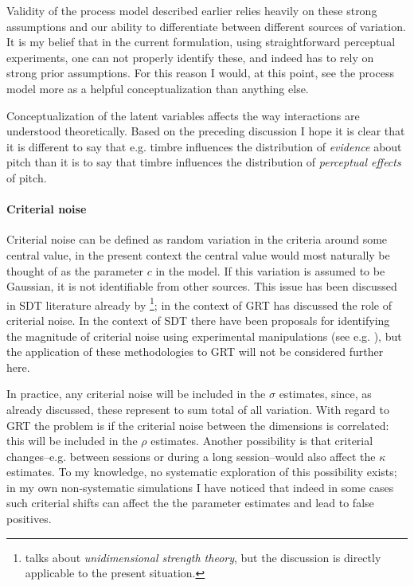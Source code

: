 \documentclass{article}\usepackage{knitr}
\begin{document}
Validity of the process model described earlier relies heavily on these strong assumptions and our ability to differentiate between different sources of variation. It is my belief that in the current formulation, using straightforward perceptual experiments, one can not properly identify these, and indeed has to rely on strong prior assumptions. For this reason I would, at this point, see the process model more as a helpful conceptualization than anything else.

Conceptualization of the latent variables affects the way interactions are understood theoretically. Based on the preceding discussion I hope it is clear that it is different to say that e.g. timbre influences the distribution of \textit{evidence} about pitch than it is to say that timbre influences the distribution of \textit{perceptual effects} of pitch.

\paragraph{Criterial noise}

Criterial noise can be defined as random variation in the criteria around some central value, in the present context the central value would most naturally be thought of as the parameter $c$ in the model. If this variation is assumed to be Gaussian, it is not identifiable from other sources. This issue has been discussed in SDT literature already by \cite{wickelgren1968}\footnote{\cite{wickelgren1968} talks about \textit{unidimensional strength theory}, but the discussion is directly applicable to the present situation.}; in the context of GRT \citet{ashby2000} has discussed the role of criterial noise. In the context of SDT there have been proposals for identifying the magnitude of criterial noise using experimental manipulations (see e.g. \citealt{kellen2012, benjamin2009, cabrera2015}), but the application of these methodologies to GRT will not be considered further here. 

In practice, any criterial noise will be included in the $\sigma$ estimates, since, as already discussed, these represent to sum total of all variation. With regard to GRT the problem is if the criterial noise between the dimensions is correlated: this will be included in the $\rho$ estimates. Another possibility is that criterial changes--e.g. between sessions or during a long session--would also affect the $\kappa$ estimates. To my knowledge, no systematic exploration of this possibility exists; in my own non-systematic simulations I have noticed that indeed in some cases such criterial shifts can affect the the parameter estimates and lead to false positives. 
\end{document}
